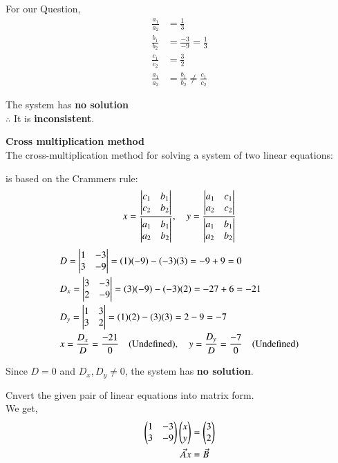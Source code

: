 \documentclass[journal]{IEEEtran}
\numberwithin{equation}{enumi}
\numberwithin{figure}{enumi}
\begin{document}
For our Question, 
\begin{align}
   \frac{a_1}{a_2} &= \frac{1}{3}\\
   \frac{b_1}{b_2} &= \frac{-3}{-9} = \frac{1}{3}\\
   \frac{c_1}{c_2} &= \frac{3}{2}\\
   \frac{a_1}{a_2} &= \frac{b_1}{b_2} \neq \frac{c_1}{c_2}
\end{align}

The system has \textbf{no solution} \\
$\therefore$ It is \textbf{inconsistent}.

\textbf{Cross multiplication method}\\
The cross-multiplication method for solving a system of two linear equations:

is based on the Crammers rule:
\begin{align}
    x = \frac{\begin{vmatrix}c_1 & b_1\\ c_2 & b_2\end{vmatrix}}{\begin{vmatrix}a_1 & b_1 \\ a_2 & b_2\end{vmatrix}}, \quad y = \frac{\begin{vmatrix}a_1 & c_1 \\ a_2 & c_2\end{vmatrix}}{\begin{vmatrix}a_1 & b_1 \\ a_2 & b_2\end{vmatrix}}
\end{align}
\begin{align}
& D = \begin{vmatrix} 1 & -3 \\ 3 & -9 \end{vmatrix} = (1)(-9) - (-3)(3) = -9 + 9 = 0 \\
& D_x = \begin{vmatrix} 3 & -3 \\ 2 & -9 \end{vmatrix} = (3)(-9) - (-3)(2) = -27 + 6 = -21 \\
& D_y = \begin{vmatrix} 1 & 3 \\ 3 & 2 \end{vmatrix} = (1)(2) - (3)(3) = 2 - 9 = -7 \\
& x = \frac{D_x}{D} = \frac{-21}{0} \quad \text{(Undefined)}, \quad y = \frac{D_y}{D} = \frac{-7}{0} \quad \text{(Undefined)}\\
\end{align}

Since \( D = 0 \) and \( D_x, D_y \neq 0 \), the system has \textbf{no solution}.

Cnvert the given pair of linear equations into matrix form.\\
We get, 
\begin{align}
    \begin{pmatrix}1 & -3 \\ 3 & -9 \end{pmatrix}\begin{pmatrix}x \\ y\end{pmatrix} &= \begin{pmatrix}3 \\ 2\end{pmatrix}\\
    \Vec{A}x &= \Vec{B} \label{A:}
\end{align}
\end{document}
